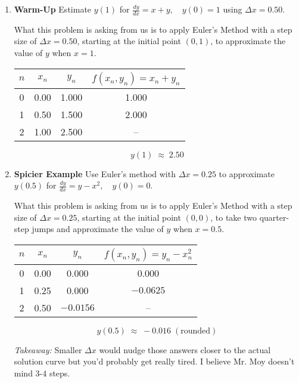 \documentclass{article}
\begin{document}
\begin{enumerate}
\item \textbf{Warm-Up}  
Estimate \(y(1)\) for 
\(\displaystyle \frac{dy}{dx}=x+y, \quad y(0)=1\)  
using \(\Delta x = 0.50\).

What this problem is asking from us is to apply Euler’s Method with a step size of \(\Delta x = 0.50\), starting at the initial point \((0,1)\), to approximate the value of \(y\) when \(x = 1\).

\begin{center}
\begin{tabular}{|c|c|c|c|}
\hline
$n$ & $x_n$ & $y_n$ & $f(x_n,y_n)=x_n+y_n$ \\ \hline
0 & 0.00 & 1.000 & 1.000 \\ \hline
1 & 0.50 & 1.500 & 2.000 \\ \hline
2 & 1.00 & 2.500 & – \\ \hline
\end{tabular}
\end{center}

\[
\boxed{\,y(1)\;\approx\;2.50\,}
\]


\item \textbf{Spicier Example}  
Use Euler’s method with \(\Delta x = 0.25\) to approximate \(y(0.5)\) for  
\(\displaystyle \frac{dy}{dx}=y-x^2, \quad y(0)=0.\)

What this problem is asking from us is to apply Euler’s Method with a step size of \(\Delta x = 0.25\), starting at the initial point \((0,0)\), to take two quarter-step jumps and approximate the value of \(y\) when \(x = 0.5\).

\begin{center}
\begin{tabular}{|c|c|c|c|}
\hline
$n$ & $x_n$ & $y_n$ & $f(x_n,y_n)=y_n-x_n^2$ \\ \hline
0 & 0.00 & 0.000 & 0.000 \\ \hline
1 & 0.25 & 0.000 & $-0.0625$ \\ \hline
2 & 0.50 & $-0.0156$ & – \\ \hline
\end{tabular}
\end{center}

\[
\boxed{\,y(0.5)\;\approx\;-0.016\;(\text{rounded})\,}
\]

\bigskip
\textit{Takeaway:} Smaller \(\Delta x\) would nudge those answers closer to the actual solution curve but you'd probably get really tired. I believe Mr. Moy doesn't mind 3-4 steps. 


\end{enumerate}
\end{document}
